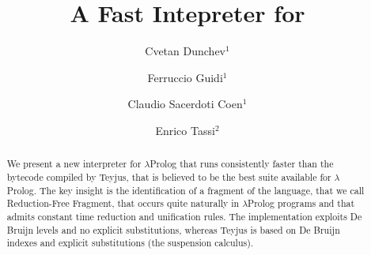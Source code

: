 \documentclass{llncs}
\begin{document}
\title{A Fast Intepreter for \lp}





\author{Cvetan Dunchev$^1$ \and
        Ferruccio Guidi$^1$ \and
        Claudio Sacerdoti Coen$^1$ \and
        Enrico Tassi$^2$}






\newcommand{\frag}{Reduction-Free Fragment}
\newcommand{\lp}{$\lambda$Prolog}
\newcommand{\elpi}{ELPI}
\newcommand{\CSC}[1]{\textcolor{red}{#1}}

\maketitle

\begin{abstract}
We present a new interpreter for \lp{} that runs consistently faster than
the bytecode compiled by Teyjus, that is believed to be the best suite
available for \lp. The key insight is the identification of a fragment of
the language, that we call \frag, that occurs quite naturally in \lp{}
programs and that admits constant time reduction and unification rules.
The implementation exploits De Bruijn levels and no explicit substitutions,
whereas Teyjus is based on De Bruijn indexes and explicit substitutions (the
suspension calculus).
\end{abstract}
\end{document}
